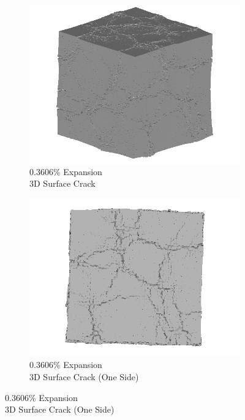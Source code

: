 \begin{figure}[ht!]
    \begin{subfigure}{.5\textwidth}
      \centering
      \includegraphics[width=0.5\linewidth]{Files/exp_3D/ASR/A30P25_2_3d.png}
      \caption{0.3606\% Expansion\\3D Surface Crack}
    \end{subfigure}%
    \begin{subfigure}{.5\textwidth}
      \centering
      \includegraphics[width=0.5\linewidth]{Files/exp_3D/ASR/A30P25_2_3ds.png}
      \caption{0.3606\% Expansion\\3D Surface Crack (One Side)}
    \end{subfigure}%


\end{figure}

